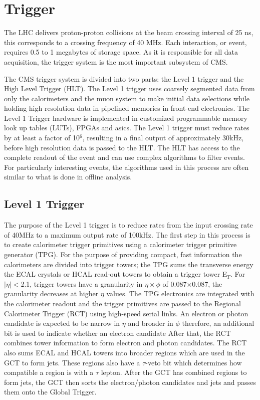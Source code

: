 \section{Trigger}
The LHC delivers proton-proton collisions at the beam crossing 
interval of 25 ns, this corresponds to a crossing frequency of 40 MHz.
Each interaction, or event, requires 0.5 to 1 megabytes of storage space.
As it is responsible for all data acquisition, %
the trigger system is the most important subsystem of CMS. 

The CMS trigger system is divided into two parts: the Level 1 trigger 
and the High Level Trigger (HLT). 
The Level 1 trigger uses coarsely segmented
data from only the calorimeters and the muon system to make initial
data selections while holding high resolution data in pipelined memories
in front-end electronics. The Level 1 Trigger hardware is implemented in customized
programmable memory look up tables (LUTs), FPGAs and asics.
The Level 1 trigger must reduce rates by at least a factor of 10$^{6}$, 
resulting in a final output of approximately 30kHz,
before high resolution data is passed to the HLT.
The HLT has access to the complete readout of the event and can use
complex algorithms to filter events. For particularly interesting events, 
the algorithms used in this process are often similar to what is done in 
offline analysis. 
  \subsection{Level 1 Trigger}
The purpose of the Level 1 trigger is to reduce rates from the input
crossing rate of 40MHz to a maximum output rate of 100kHz. 
The first step in this process is to create
calorimeter trigger primitives using a calorimeter trigger primitive generator (TPG).
For the purpose of providing compact, fast information the calorimeters
are divided into trigger towers; the TPG sums the transverse energy the
ECAL crystals or HCAL read-out towers to obtain a trigger tower E$_{T}$.
For $|\eta|<$2.1, trigger towers have a granularity
in $\eta \times \phi$ of 0.087$\times$0.087, the granularity decreases at higher
$\eta$ values. 
The TPG electronics are integrated with the calorimeter readout and the trigger primitives
are passed to the Regional Calorimeter Trigger (RCT) using
high-speed serial links.
An electron or photon candidate is expected to be narrow in $\eta$
and broader in $\phi$ therefore, an additional bit is used to indicate whether 
an electron candidate  
After that, the RCT combines tower information to form electron and 
photon candidates. The RCT also sums ECAL and HCAL towers into broader
regions which are used in the GCT to form jets. These regions also have a 
$\tau$-veto bit which determines how compatible a region is with a
$\tau$ lepton. After the GCT has combined regions to form jets, the GCT
then sorts the electron/photon candidates and jets and passes them onto
the Global Trigger.

